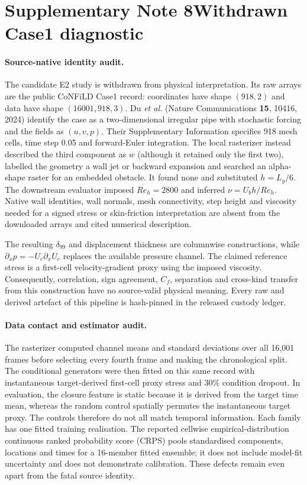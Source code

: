 \documentclass[11pt]{article}
\begin{document}
\section*{Supplementary Note 8\quad Withdrawn Case1 diagnostic}\label{sec:s-e2}

\paragraph{Source-native identity audit.}
The candidate E2 study is withdrawn from physical interpretation. Its raw arrays are the public
CoNFiLD Case1 record: coordinates have shape $(918,2)$ and data have shape
$(16001,918,3)$. Du \emph{et al.} (Nature Communications \textbf{15}, 10416, 2024) identify the
case as a two-dimensional irregular pipe with
stochastic forcing and the fields as $(u,v,p)$. Their Supplementary Information
specifies 918 mesh cells, time step 0.05 and forward-Euler integration. The local rasterizer instead
described the third component as $w$ (although it retained only the first two), labelled the
geometry a wall jet or backward expansion and searched an alpha-shape raster for an embedded
obstacle. It found none and substituted $h=L_y/6$. The downstream
evaluator imposed $Re_h=2800$ and inferred $\nu=U_bh/Re_h$. Native wall identities, wall normals,
mesh connectivity, step height and viscosity needed for a signed stress or skin-friction
interpretation are absent from the downloaded arrays and cited numerical description.

The resulting $\delta_{99}$ and displacement thickness are columnwise constructions, while
$\partial_xp=-U_e\partial_xU_e$ replaces the available pressure channel. The claimed reference
stress is a first-cell velocity-gradient proxy using the imposed viscosity. Consequently,
correlation, sign agreement, $C_f$, separation and cross-kind transfer from this construction have
no source-valid physical meaning. Every raw and derived artefact of this pipeline is hash-pinned
in the released custody ledger.

\paragraph{Data contact and estimator audit.}
The rasterizer computed channel means and standard deviations over all 16,001 frames before
selecting every fourth frame and making the chronological split. The conditional generators were
then fitted on this same record with instantaneous target-derived first-cell proxy stress and
30\% condition dropout. In evaluation, the closure feature is static because it is derived from
the target time mean, whereas the random control spatially permutes the instantaneous target proxy.
The controls therefore do not all match temporal information. Each family has one fitted training
realisation. The reported cellwise empirical-distribution continuous ranked probability score
(CRPS) pools standardised components, locations and times for a 16-member fitted ensemble; it does
not include model-fit uncertainty and does not demonstrate calibration. These defects remain even
apart from the fatal source identity.
\end{document}
